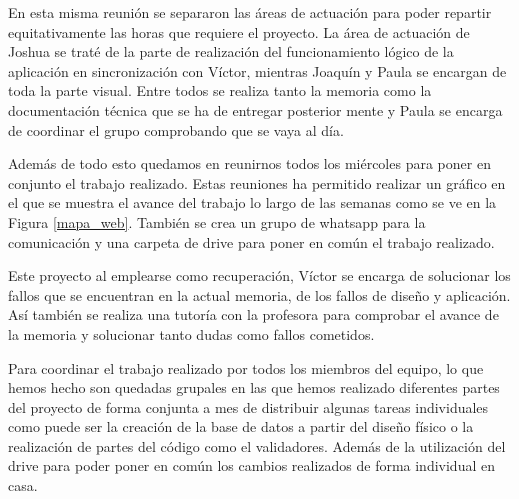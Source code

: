 \documentclass[pdftex,11pt,a4paper]{book}
\begin{document}
En esta misma reunión se separaron las áreas de actuación para poder repartir equitativamente las horas que requiere el proyecto.
La área de actuación de Joshua se traté de la parte de realización del funcionamiento lógico de la aplicación en sincronización con Víctor, mientras Joaquín y Paula se encargan de toda la parte visual. Entre todos se realiza tanto la memoria como la documentación técnica que se ha de entregar posterior mente y Paula se encarga de coordinar el grupo comprobando que se vaya al día.

Además de todo esto quedamos en reunirnos todos los miércoles para poner en conjunto el trabajo realizado. Estas reuniones ha permitido realizar un gráfico en el que se muestra el avance del trabajo lo largo de las semanas como se ve en la Figura \ref{mapa_web}. También se crea un grupo de whatsapp para la comunicación y una carpeta de drive para poner en común el trabajo realizado.

Este proyecto al emplearse como recuperación, Víctor se encarga de solucionar los fallos que se encuentran en la actual memoria, de los fallos de diseño y aplicación. Así también se realiza una tutoría con la profesora para comprobar el avance de la memoria y solucionar tanto dudas como fallos cometidos.

Para coordinar el trabajo realizado por todos los miembros del equipo, lo que hemos hecho son quedadas grupales en las que hemos realizado diferentes partes del proyecto de forma conjunta a mes de distribuir algunas tareas individuales como puede ser la creación de la base de datos a partir del diseño físico o la realización de partes del código como el validadores. Además de la utilización del drive para poder poner en común los cambios realizados de forma individual en casa.
\end{document}
